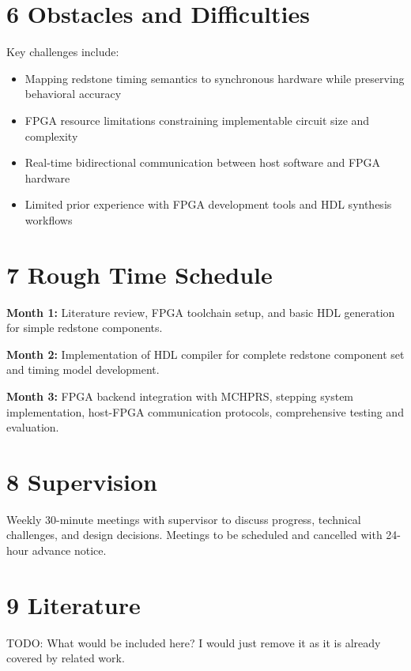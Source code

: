 \documentclass[a4paper,11pt]{article}
\begin{document}
\section*{6 Obstacles and Difficulties}

Key challenges include:
\begin{itemize}[parsep=0.5em]
    \item Mapping redstone timing semantics to synchronous hardware while preserving behavioral accuracy
    \item FPGA resource limitations constraining implementable circuit size and complexity
    \item Real-time bidirectional communication between host software and FPGA hardware
    \item Limited prior experience with FPGA development tools and HDL synthesis workflows
\end{itemize}

\section*{7 Rough Time Schedule}

\textbf{Month 1:} Literature review, FPGA toolchain setup, and basic HDL generation for simple redstone components.

\textbf{Month 2:} Implementation of HDL compiler for complete redstone component set and timing model development.

\textbf{Month 3:} FPGA backend integration with MCHPRS, stepping system implementation, host-FPGA communication protocols, comprehensive testing and evaluation.

\section*{8 Supervision}

Weekly 30-minute meetings with supervisor to discuss progress, technical challenges, and design decisions.
Meetings to be scheduled and cancelled with 24-hour advance notice.

\section*{9 Literature}

TODO: What would be included here? I would just remove it as it is already covered by related work.

\printbibliography[title=References]
\end{document}
